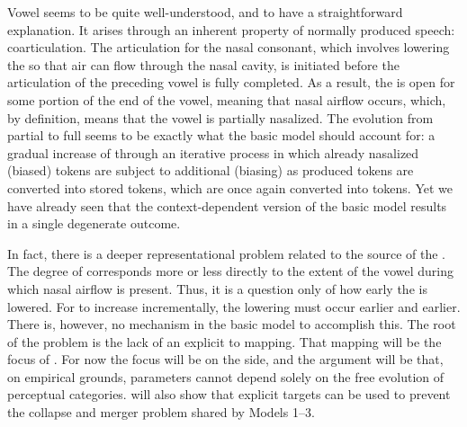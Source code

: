 Vowel  seems to be quite well-understood, and to have
a straightforward explanation. It arises through an inherent property
of normally produced speech: coarticulation. The articulation for
the nasal consonant, which involves lowering the  so that air
can flow through the nasal cavity, is initiated before the articulation
of the preceding vowel is fully completed. As a result, the 
is open for some portion of the end of the vowel, meaning that nasal
airflow occurs, which, by definition, means that the vowel is partially
nasalized. The evolution from partial to full  seems to
be exactly what the basic  model should account for: a gradual
increase of  through an iterative process in which already
nasalized (biased) tokens are subject to additional  (biasing)
as produced tokens are converted into stored tokens, which are once
again converted into  tokens. Yet we have already seen that
the context-dependent version of the basic  model results
in a single degenerate outcome. 

In fact, there is a deeper representational problem related to the
source of the . The degree of  corresponds more
or less directly to the extent of the vowel during which nasal airflow
is present. Thus, it is a question only of how early the  is
lowered. For  to increase incrementally, the  lowering
must occur earlier and earlier. There is, however, no mechanism in
the basic  model to accomplish this. The root of the problem
is the lack of an explicit  to  mapping. That
mapping will be the focus of .
For now the focus will be on the  side, and the argument
will be that, on empirical grounds,  parameters cannot
depend solely on the free evolution of perceptual categories. 
 will also show that explicit 
targets can be used to prevent the collapse and merger problem shared
by Models 1--3.
